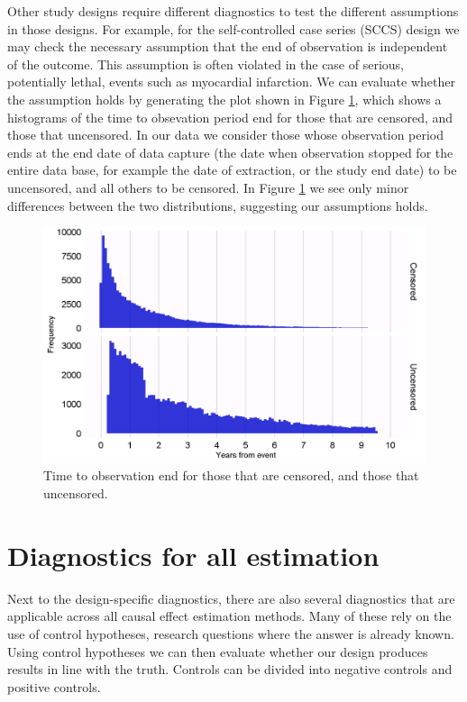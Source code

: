 \documentclass[11pt]{book}
\begin{document}
Other study designs require different diagnostics to test the different
assumptions in those designs. For example, for the self-controlled case
series (SCCS) design we may check the necessary assumption that the end
of observation is independent of the outcome. This assumption is often
violated in the case of serious, potentially lethal, events such as
myocardial infarction. We can evaluate whether the assumption holds by
generating the plot shown in Figure \ref{fig:timeToObsEnd}, which shows
a histograms of the time to obsevation period end for those that are
censored, and those that uncensored. In our data we consider those whose
observation period ends at the end date of data capture (the date when
observation stopped for the entire data base, for example the date of
extraction, or the study end date) to be uncensored, and all others to
be censored. In Figure \ref{fig:timeToObsEnd} we see only minor
differences between the two distributions, suggesting our assumptions
holds.

\begin{figure}

{\centering \includegraphics[width=1\linewidth]{images/MethodValidity/timeToObsEnd} 

}

\caption{Time to observation end for those that are censored, and those that uncensored.}\label{fig:timeToObsEnd}
\end{figure}

\section{Diagnostics for all
estimation}\label{diagnostics-for-all-estimation}

Next to the design-specific diagnostics, there are also several
diagnostics that are applicable across all causal effect estimation
methods. Many of these rely on the use of control hypotheses, research
questions where the answer is already known. Using control hypotheses we
can then evaluate whether our design produces results in line with the
truth. Controls can be divided into negative controls and positive
controls.
\end{document}
